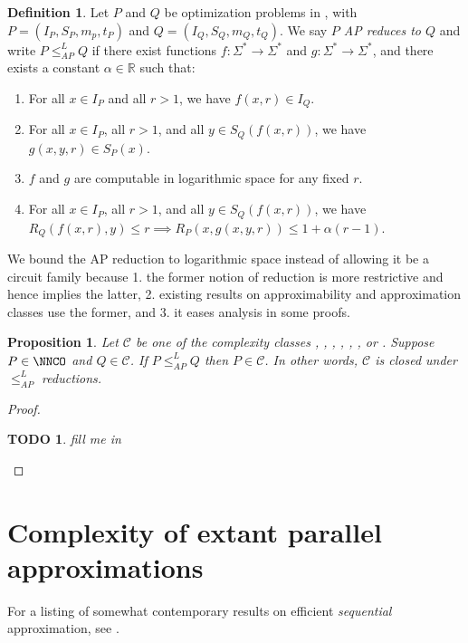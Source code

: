 \documentclass[]{article}
\theoremstyle{plain}
\newtheorem{proposition}{Proposition}
\newtheorem{todo}{TODO}
\theoremstyle{definition}
\newtheorem{definition}{Definition}
\newcommand{\APr}{\leq_{AP}^{L}}
\begin{document}
\begin{definition}{\cite[Definition~9]{ckst95}}
  Let $P$ and $Q$ be optimization problems in \NNCO, with $P=(I_P, S_P, m_p, t_P)$ and $Q=(I_Q, S_Q, m_Q, t_Q)$.
  We say \emph{$P$ AP reduces to $Q$} and write $P\APr Q$ if there exist functions $f\colon\Sigma^*\to\Sigma^*$ and $g\colon\Sigma^*\to\Sigma^*$, and there exists a constant $\alpha\in\mathbb{R}$ such that:
  \begin{enumerate}
  \item For all $x\in I_P$ and all $r > 1$, we have $f(x, r)\in I_Q$.
  \item For all $x\in I_P$, all $r > 1$, and all $y\in S_Q(f(x, r))$, we have $g(x, y, r)\in S_P(x)$.
  \item $f$ and $g$ are computable in logarithmic space for any fixed $r$.
  \item For all $x\in I_P$, all $r > 1$, and all $y\in S_Q(f(x, r))$, we have $R_Q(f(x, r), y) \leq r \implies R_P(x, g(x, y, r)) \leq 1 + \alpha(r - 1)$.
  \end{enumerate}
\end{definition}

We bound the AP reduction to logarithmic space instead of allowing it be a \FNC{} circuit family because 1. the former notion of reduction is more restrictive and hence implies the latter, 2. existing results on approximability and approximation classes use the former, and 3. it eases analysis in some proofs.

\begin{proposition}
  Let $\mathcal{C}$ be one of the complexity classes \NCO, \NCAS, \ApxNCO, \logApxNCO, \polyApxNCO, \expApxNCO, or \NNCO.
  Suppose $P\in\NNCO$ and $Q\in\mathcal{C}$.
  If $P\APr Q$ then $P\in \mathcal{C}$.
  In other words, $\mathcal{C}$ is closed under $\APr$ reductions.
\end{proposition}
\begin{proof}
  \begin{todo}
    fill me in
  \end{todo}
\end{proof}

\section{Complexity of extant parallel approximations}

For a listing of somewhat contemporary results on efficient \emph{sequential} approximation, see \cite{compendium}.
\end{document}
